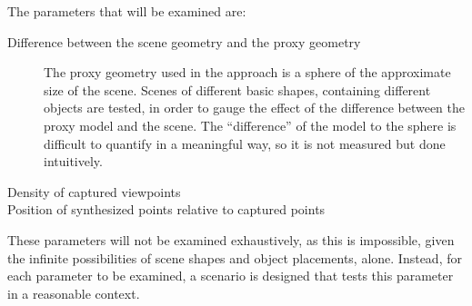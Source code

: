 The parameters that will be examined are:
\begin{description}
  \item[Difference between the scene geometry and the proxy geometry] The proxy geometry used in the approach is a sphere of the approximate size of the scene. Scenes of different basic shapes, containing different objects are tested, in order to gauge the effect of the difference between the proxy model and the scene. The ``difference'' of the model to the sphere is difficult to quantify in a meaningful way, so it is not measured but done intuitively.
  \item[Density of captured viewpoints] 
  \item[Position of synthesized points relative to captured points] 
\end{description}

These parameters will not be examined exhaustively, as this is impossible, given the infinite possibilities of scene shapes and object placements, alone. Instead, for each parameter to be examined, a scenario is designed that tests this parameter in a reasonable context.


%
%
%
%

